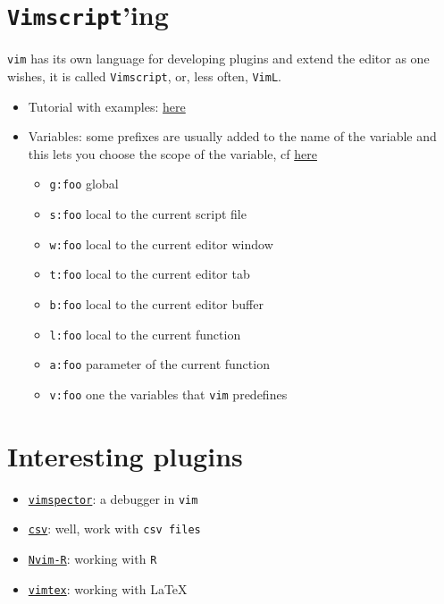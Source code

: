 \documentclass[a4paper,12pt,%
              final%
              ]{article}
\newcommand{\vim}{\texttt{vim}}
\newcommand{\vimscript}{\texttt{Vimscript}}
\begin{document}
\section{\vimscript{}'ing}
\vim{} has its own language for developing plugins and extend the editor as one wishes, it is called \vimscript{}, or, less often, \texttt{VimL}.
\begin{itemize}
  \item Tutorial with examples: \href{https://learnvimscriptthehardway.stevelosh.com/}{here}
  \item Variables: some prefixes are usually added to the name of the variable and this lets you choose the scope of the variable, cf \href{https://developer.ibm.com/articles/l-vim-script-1/#values-and-variables}{here}
    \begin{itemize}
      \item \texttt{g:foo} global
      \item \texttt{s:foo} local to the current script file
      \item \texttt{w:foo} local to the current editor window
      \item \texttt{t:foo} local to the current editor tab
      \item \texttt{b:foo} local to the current editor buffer
      \item \texttt{l:foo} local to the current function
      \item \texttt{a:foo} parameter of the current function
      \item \texttt{v:foo} one the variables that \vim{} predefines
    \end{itemize}
\end{itemize}

\section{Interesting plugins}
\begin{itemize}
  \item \href{https://github.com/puremourning/vimspector}{\texttt{vimspector}}: a
    debugger in \vim{}
  \item \href{https://github.com/chrisbra/csv.vim}{\texttt{csv}}: well, work with \texttt{csv files}
  \item \href{https://github.com/jalvesaq/Nvim-R}{\texttt{Nvim-R}}: working with \texttt{R}
  \item \href{https://github.com/lervag/vimtex}{\texttt{vimtex}}: working with \LaTeX{}
\end{itemize}
%
%
\end{document}
